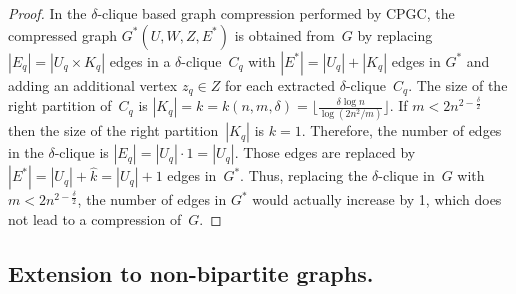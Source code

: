 \begin{proof}
    In the $\delta$-clique based graph compression performed by \textsf{CPGC}, the compressed graph $G^*(U,W,Z,E^*)$ is obtained from~$G$ by replacing $|E_q| = |U_q \times K_q|$ edges in a $\delta$-clique~$C_q$ with $|E^*| = |U_q| + |K_q|$ edges in $G^*$ and adding an additional vertex $z_q \in Z$ for each extracted $\delta$-clique~$C_q$. 
    The size of the right partition of~$C_q$ is $|K_q|={k} = k(n,m, \delta)=\Big\lfloor{\frac{\delta \log n}{\log(2n^2/m)} }\Big\rfloor$. If $m < 2n^{2-\frac{\delta}{2}}$ then the size of the right partition~$|K_q|$ is $k = 1$. Therefore, the number of edges in the $\delta$-clique is $|E_q| = |U_q| \cdot 1 = |U_q|$. Those edges are replaced by $ |E^*|  = |U_q| + \hat{k} = |U_q| + 1$ edges in~$G^*$. Thus, replacing the $\delta$-clique in~$G$ with $m < 2n^{2-\frac{\delta}{2}}$, the number of edges in $G^*$ would actually increase by 1, which does not lead to a compression of~$G$. 
\end{proof}


\subsection{Extension to non-bipartite graphs.}\label{sec:appendix:non-bip}

